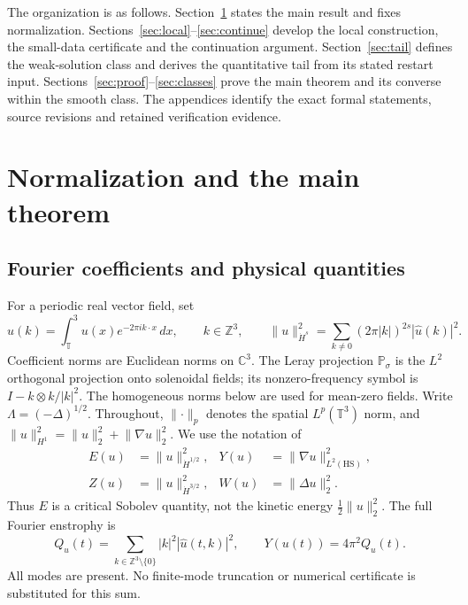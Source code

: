 \documentclass[11pt,a4paper]{article}
\numberwithin{equation}{section}
\theoremstyle{plain}
\theoremstyle{definition}
\theoremstyle{remark}
\newcommand{\T}{\mathbb T^3}
\newcommand{\Z}{\mathbb Z}
\newcommand{\HH}[1]{\dot H^{#1}}
\newcommand{\norm}[2]{\lVert #1\rVert_{#2}}
\newcommand{\Psol}{\mathbb P_\sigma}
\begin{document}
The organization is as follows. Section~\ref{sec:main} states the main
result and fixes normalization. Sections~\ref{sec:local}--\ref{sec:continue}
develop the local construction, the small-data certificate and the
continuation argument. Section~\ref{sec:tail} defines the weak-solution
class and derives the quantitative tail from its stated restart input.
Sections~\ref{sec:proof}--\ref{sec:classes} prove the main theorem and
its converse within the smooth class. The appendices identify the exact
formal statements, source revisions and retained verification evidence.


\section{Normalization and the main theorem}\label{sec:main}
\subsection{Fourier coefficients and physical quantities}
For a periodic real vector field, set
\begin{equation}\label{eq:fourier}
 \widehat u(k)=\int_\T u(x)e^{-2\pi i k\cdot x}\,dx,
 \qquad k\in\Z^3,
 \qquad
 \norm{u}{\HH{s}}^2=\sum_{k\ne0}(2\pi|k|)^{2s}|\widehat u(k)|^2.
\end{equation}
Coefficient norms are Euclidean norms on $\mathbb C^3$.
The Leray projection $\Psol$ is the $L^2$ orthogonal projection onto
solenoidal fields; its nonzero-frequency symbol is
$I-k\otimes k/|k|^2$. The homogeneous norms below are used for mean-zero
fields.
Write $\Lambda=(-\Delta)^{1/2}$. Throughout, $\norm{\cdot}{p}$ denotes
the spatial $L^p(\T)$ norm, and
$\norm{u}{H^1}^2=\norm{u}{2}^2+\norm{\nabla u}{2}^2$.
We use the notation of \cite{small}
\begin{equation}\label{eq:energies}
\begin{aligned}
 E(u)&=\norm{u}{\HH{1/2}}^2,&
 Y(u)&=\norm{\nabla u}{L^2(\mathrm{HS})}^2,\\
 Z(u)&=\norm{u}{\HH{3/2}}^2,&
 W(u)&=\norm{\Delta u}{2}^2.
\end{aligned}
\end{equation}
Thus $E$ is a critical Sobolev quantity, not the kinetic energy
$\frac12\norm{u}{2}^2$. The full Fourier enstrophy is
\begin{equation}\label{eq:Q}
 Q_u(t)=\sum_{k\in\Z^3\setminus\{0\}}|k|^2|\widehat u(t,k)|^2,
 \qquad Y(u(t))=4\pi^2Q_u(t).
\end{equation}
All modes are present. No finite-mode truncation or numerical certificate
is substituted for this sum.
\end{document}
